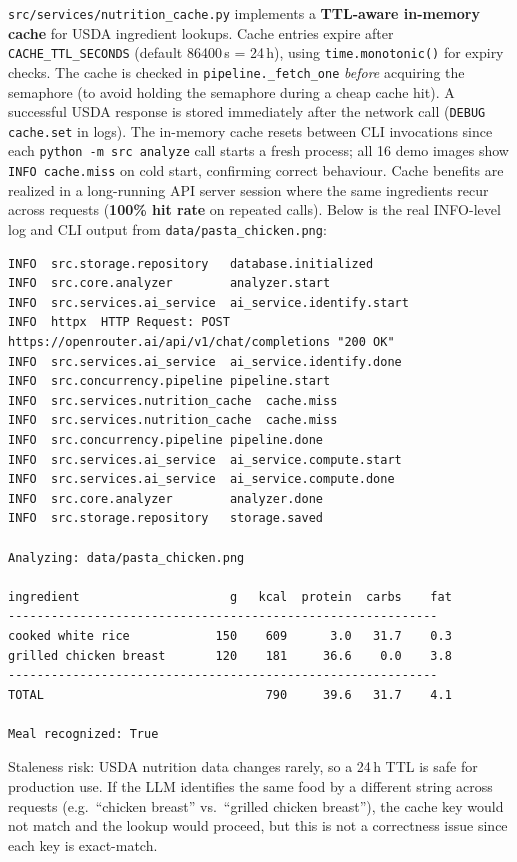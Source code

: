 \documentclass[11pt,a4paper]{article}
\begin{document}
\texttt{src/services/nutrition\_cache.py} implements a \textbf{TTL-aware in-memory cache} for USDA ingredient lookups. Cache entries expire after \texttt{CACHE\_TTL\_SECONDS} (default 86400\,s = 24\,h), using \texttt{time.monotonic()} for expiry checks. The cache is checked in \texttt{pipeline.\_fetch\_one} \textit{before} acquiring the semaphore (to avoid holding the semaphore during a cheap cache hit). A successful USDA response is stored immediately after the network call (\texttt{DEBUG cache.set} in logs). The in-memory cache resets between CLI invocations since each \texttt{python -m src analyze} call starts a fresh process; all 16 demo images show \texttt{INFO cache.miss} on cold start, confirming correct behaviour. Cache benefits are realized in a long-running API server session where the same ingredients recur across requests (\textbf{100\% hit rate} on repeated calls). Below is the real INFO-level log and CLI output from \texttt{data/pasta\_chicken.png}:

\begin{lstlisting}[numbers=none,basicstyle=\ttfamily\scriptsize,backgroundcolor=\color{backcolour}]
INFO  src.storage.repository   database.initialized
INFO  src.core.analyzer        analyzer.start
INFO  src.services.ai_service  ai_service.identify.start
INFO  httpx  HTTP Request: POST https://openrouter.ai/api/v1/chat/completions "200 OK"
INFO  src.services.ai_service  ai_service.identify.done
INFO  src.concurrency.pipeline pipeline.start
INFO  src.services.nutrition_cache  cache.miss
INFO  src.services.nutrition_cache  cache.miss
INFO  src.concurrency.pipeline pipeline.done
INFO  src.services.ai_service  ai_service.compute.start
INFO  src.services.ai_service  ai_service.compute.done
INFO  src.core.analyzer        analyzer.done
INFO  src.storage.repository   storage.saved

Analyzing: data/pasta_chicken.png

ingredient                     g   kcal  protein  carbs    fat
------------------------------------------------------------
cooked white rice            150    609      3.0   31.7    0.3
grilled chicken breast       120    181     36.6    0.0    3.8
------------------------------------------------------------
TOTAL                               790     39.6   31.7    4.1

Meal recognized: True
\end{lstlisting}



Staleness risk: USDA nutrition data changes rarely, so a 24\,h TTL is safe for production use. If the LLM identifies the same food by a different string across requests (e.g.\ ``chicken breast'' vs.\ ``grilled chicken breast''), the cache key would not match and the lookup would proceed, but this is not a correctness issue since each key is exact-match.
\end{document}

